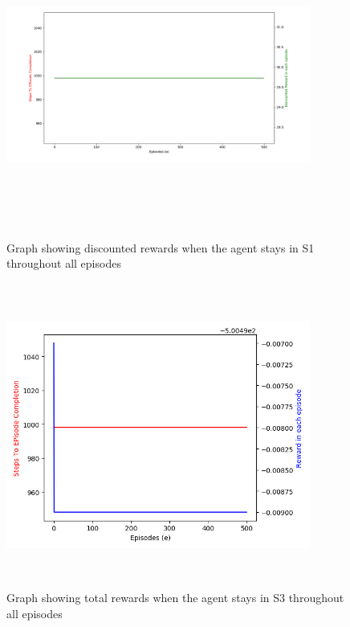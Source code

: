 \documentclass[conference]{IEEEtran}
\begin{document}
\begin{figure}[htbp]
\centerline{\includegraphics[width=10cm,height=10cm,keepaspectratio]{31-69_2.png}}
\caption{Graph showing discounted rewards when the agent stays in S1 throughout all episodes}
\label{fig}
\end{figure}

\begin{figure}[htbp]
\centerline{\includegraphics[width=10cm,height=10cm,keepaspectratio]{71-99_1.png}}
\caption{Graph showing total rewards when the agent stays in S3 throughout all episodes}
\label{fig}
\end{figure}
\end{document}
